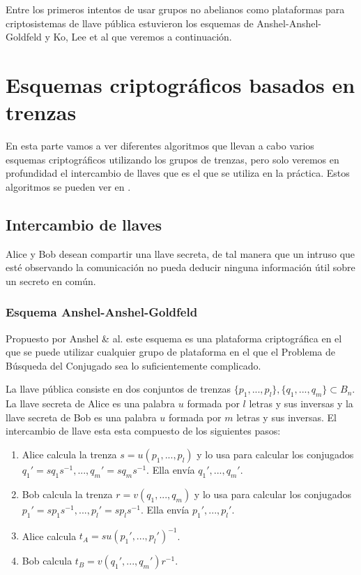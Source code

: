 \documentclass[12pt]{book}
\theoremstyle{definition}
\begin{document}
Entre los primeros intentos de usar grupos no abelianos como plataformas para criptosistemas de llave pública estuvieron los esquemas de Anshel-Anshel-Goldfeld y Ko, Lee et al que veremos a continuación.





\section{Esquemas criptográficos basados en trenzas}

En esta parte vamos a ver diferentes algoritmos que llevan a cabo varios esquemas criptográficos utilizando los grupos de trenzas, pero solo veremos en profundidad el intercambio de llaves que es el que se utiliza en la práctica. Estos algoritmos se pueden ver en \cite{Deh}.

\subsection{Intercambio de llaves}
Alice y Bob desean compartir una llave secreta, de tal manera que un intruso que esté observando la comunicación no pueda deducir ninguna información útil sobre un secreto en común.

\subsubsection*{Esquema Anshel-Anshel-Goldfeld}
Propuesto por Anshel \& al. \cite{AAG} este esquema es una plataforma criptográfica en el que se puede utilizar cualquier grupo de plataforma en el que el Problema de Búsqueda del Conjugado sea lo suficientemente complicado.

La llave pública consiste en dos conjuntos de trenzas $\{p_1,...,p_l\},\{q_1,...,q_m\}\subset B_n$. La llave secreta de Alice es una palabra $u$ formada por $l$ letras y sus inversas y la llave secreta de Bob es una palabra $u$ formada por $m$ letras y sus inversas. El intercambio de llave esta esta compuesto de los siguientes pasos:

\begin{enumerate}
\item Alice calcula la trenza $s = u(p_1,...,p_l)$ y lo usa para calcular los conjugados $q_1'=sq_1s^{-1},...,q_m'=sq_ms^{-1}$. Ella envía $q_1',...,q_m'.$
\item Bob calcula la trenza $r = v(q_1,...,q_m)$ y lo usa para calcular los conjugados $p_1'=sp_1s^{-1},...,p_l'=sp_ls^{-1}$. Ella envía $p_1',...,p_l'.$
\item Alice calcula $t_A = su(p_1',...,p_l')^{-1}$.
\item Bob calcula $t_B = v(q_1',...,q_m')r^{-1}$.
\end{enumerate}
\end{document}
